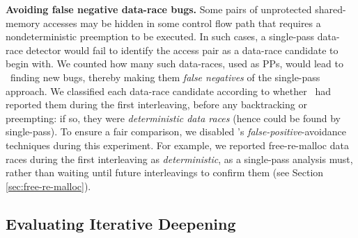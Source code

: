 {\bf Avoiding false negative data-race bugs.}
Some pairs of unprotected shared-memory accesses may be hidden in some control flow path that requires a nondeterministic preemption to be executed.
In such cases, a single-pass data-race detector
would fail
to identify the access pair as a data-race candidate to begin with.
%
We counted how many such data-races, used as PPs, would lead to \landslide~finding new bugs,
thereby making them {\em false negatives} of the single-pass approach.
We classified each data-race candidate according to whether \landslide~had reported them during the first interleaving, before any backtracking or preempting: if so, they were {\em deterministic data races} (hence could be found by single-pass).
%
To ensure a fair comparison, we disabled \landslide's {\em false-positive}-avoidance techniques during this experiment.
For example, we reported free-re-malloc data races during the first interleaving as {\em deterministic}, as a single-pass analysis must, rather than waiting until future interleavings to confirm them (see Section \ref{sec:free-re-malloc}).

\subsection{Evaluating Iterative Deepening}



